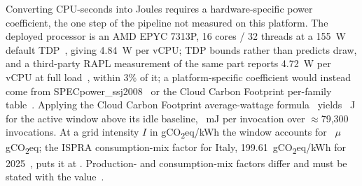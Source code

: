 Converting CPU-seconds into Joules requires a hardware-specific power coefficient, the one
step of the pipeline not measured on this platform. The deployed processor is an AMD EPYC
7313P, 16 cores / 32 threads at a 155~W default TDP~\cite{amd_epyc7313p}, giving 4.84~W per
vCPU;  TDP bounds rather than predicts draw, and a
third-party RAPL measurement of the same part reports 4.72~W per vCPU at full
load~\cite{epyc7313power}, within 3\% of it; a platform-specific coefficient would instead
come from SPECpower\_ssj2008~\cite{specpower} or the Cloud Carbon Footprint per-family
table~\cite{ccf}.  Applying the Cloud Carbon Footprint
average-wattage formula~\cite{ccf} yields ~J for the active window
above its idle baseline, ~mJ per invocation over ${\approx}$79{,}300
invocations. At a grid intensity $I$ in gCO\textsubscript{2}eq/kWh the window accounts for
~$\mu$gCO\textsubscript{2}eq; the ISPRA consumption-mix factor for
Italy, 199.61~gCO\textsubscript{2}eq/kWh for 2025~\cite{ispra_settore_elettrico}, puts it
at . Production- and consumption-mix factors
differ and must be stated with the value~\cite{eea_grid_intensity}.

